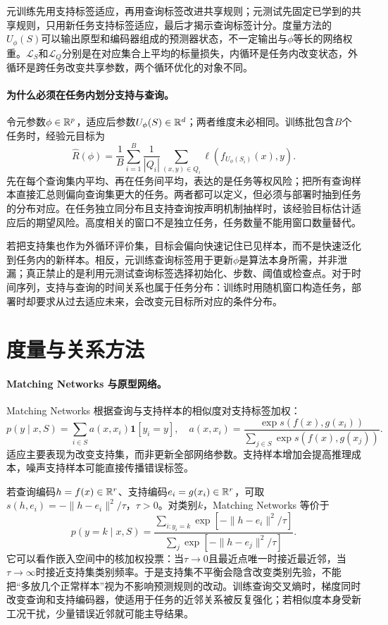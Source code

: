 元训练先用支持标签适应，再用查询标签改进共享规则；元测试先固定已学到的共享规则，只用新任务支持标签适应，最后才揭示查询标签计分。度量方法的$U_\phi(S)$可以输出原型和编码器组成的预测器状态，不一定输出与$\phi$等长的网络权重。$\mathcal L_S$和$\mathcal L_Q$分别是在对应集合上平均的标量损失，内循环是任务内改变状态，外循环是跨任务改变共享参数，两个循环优化的对象不同。

\paragraph{为什么必须在任务内划分支持与查询。}
令元参数$\phi\in\mathbb{R}^p$，适应后参数$U_\phi(S)\in\mathbb{R}^d$；两者维度未必相同。训练批包含$B$个任务时，经验元目标为
\begin{equation}
 \widehat R(\phi)=\frac1B\sum_{i=1}^B
 \frac1{|Q_i|}\sum_{(x,y)\in Q_i}
 \ell(f_{U_\phi(S_i)}(x),y).
\end{equation}
先在每个查询集内平均、再在任务间平均，表达的是任务等权风险；把所有查询样本直接汇总则偏向查询集更大的任务。两者都可以定义，但必须与部署时抽到任务的分布对应。在任务独立同分布且支持查询按声明机制抽样时，该经验目标估计适应后的期望风险。高度相关的窗口不是独立任务，任务数量不能用窗口数量替代。

若把支持集也作为外循环评价集，目标会偏向快速记住已见样本，而不是快速泛化到任务内的新样本。相反，元训练查询标签用于更新$\phi$是算法本身所需，并非泄漏；真正禁止的是利用元测试查询标签选择初始化、步数、阈值或检查点。对于时间序列，支持与查询的时间关系也属于任务分布：训练时用随机窗口构造任务，部署时却要求从过去适应未来，会改变元目标所对应的条件分布。

\section{度量与关系方法}
\paragraph{Matching Networks 与原型网络。}
Matching Networks 根据查询与支持样本的相似度对支持标签加权\cite{vinyals2016matching}：
\begin{equation}
 p(y\mid x,S)=\sum_{i\in S}a(x,x_i)\mathbf1[y_i=y],
 \quad a(x,x_i)=\frac{\exp s(f(x),g(x_i))}{\sum_{j\in S}\exp s(f(x),g(x_j))}.
\end{equation}
适应主要表现为改变支持集，而非更新全部网络参数。支持样本增加会提高推理成本，噪声支持样本可能直接传播错误标签。

若查询编码$h=f(x)\in\mathbb{R}^r$、支持编码$e_i=g(x_i)\in\mathbb{R}^r$，可取$s(h,e_i)=-\|h-e_i\|^2/\tau$，$\tau>0$。对类别$k$，Matching Networks 等价于
\begin{equation}
 p(y=k\mid x,S)=
 \frac{\sum_{i:y_i=k}\exp[-\|h-e_i\|^2/\tau]}
 {\sum_j\exp[-\|h-e_j\|^2/\tau]}.
\end{equation}
它可以看作嵌入空间中的核加权投票：当$\tau\to0$且最近点唯一时接近最近邻，当$\tau\to\infty$时接近支持集类别频率。于是支持集不平衡会隐含改变类别先验，不能把“多放几个正常样本”视为不影响预测规则的改动。训练查询交叉熵时，梯度同时改变查询和支持编码器，使适用于任务的近邻关系被反复强化；若相似度本身受新工况干扰，少量错误近邻就可能主导结果。

